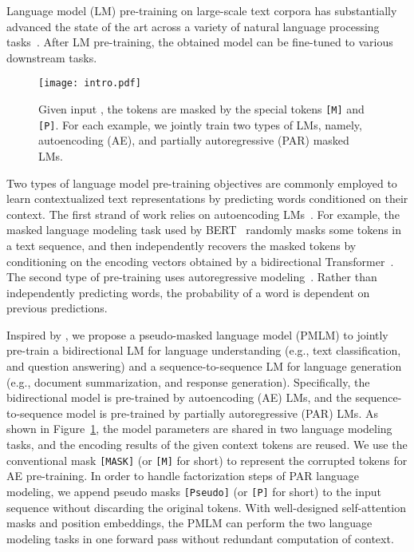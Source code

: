 \documentclass{article}
\newcommand\pmlmfull{pseudo-masked language model}
\newcommand\pmlm{\textsc{PMLM}}
\newcommand{\sptk}[1]{\texttt{[#1]}}
\begin{document}
Language model (LM) pre-training on large-scale text corpora has substantially advanced the state of the art across a variety of natural language processing tasks~\cite{elmo,gpt,bert,unilm,roberta,xlnet,bart,albert,t5}.
After LM pre-training, the obtained model can be fine-tuned to various downstream tasks.


\begin{figure}[t]
\centering
\texttt{[image: intro.pdf]}
\caption{
Given input , the tokens  are masked by the special tokens \sptk{M} and \sptk{P}.
For each example, we jointly train two types of LMs, namely, autoencoding (AE), and partially autoregressive (PAR) masked LMs.
}
\label{fig:intro}
\end{figure}


Two types of language model pre-training objectives are commonly employed to learn contextualized text representations by predicting words conditioned on their context.
The first strand of work relies on autoencoding LMs~\cite{bert,roberta}.
For example, the masked language modeling task used by BERT~\cite{bert} randomly masks some tokens in a text sequence, and then independently recovers the masked tokens by conditioning on the encoding vectors obtained by a bidirectional Transformer~\cite{transformer}.
The second type of pre-training uses autoregressive modeling~\cite{gpt,bart,xlnet,t5}.
Rather than independently predicting words, the probability of a word is dependent on previous predictions.

Inspired by \cite{unilm}, we propose a \pmlmfull{} (\pmlm{}) to jointly pre-train a bidirectional LM for language understanding (e.g., text classification, and question answering) and a sequence-to-sequence LM for language generation (e.g., document summarization, and response generation).
Specifically, the bidirectional model is pre-trained by autoencoding (AE) LMs, and the sequence-to-sequence model is pre-trained by partially autoregressive (PAR) LMs.
As shown in Figure~\ref{fig:intro}, the model parameters are shared in two language modeling tasks, and the encoding results of the given context tokens are reused.
We use the conventional mask \sptk{MASK} (or \sptk{M} for short) to represent the corrupted tokens for AE pre-training.
In order to handle factorization steps of PAR language modeling, we append pseudo masks \sptk{Pseudo} (or \sptk{P} for short) to the input sequence without discarding the original tokens.
With well-designed self-attention masks and position embeddings, the \pmlm{} can perform the two language modeling tasks in one forward pass without redundant computation of context.
\end{document}
